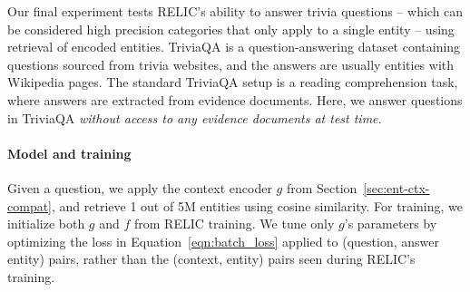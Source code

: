 \documentclass{article} \usepackage{iclr2020_conference,times}
\newcommand{\ack}{RELIC\xspace}
\newcommand{\context}{g}
\newcommand{\concept}{f}
\begin{document}
\begin{comment}
\begin{table*}[]
    \small
    \centering
    \begin{tabular}{|c|cc|cc|cc|cc|}
    \hline
    & \multicolumn{2}{c|}{Web} & \multicolumn{2}{c|}{Web verified} & \multicolumn{2}{c|}{Wiki} & \multicolumn{2}{c|}{Wiki verified} \\
    & EM & F1 & EM & F1 & EM & F1 & EM & F1 \\
    \hline
    Classifier \citep{joshi2017triviaqa} & 24.0 & 28.4 & 30.2& 34.7 & 22.5 & 26.5 & 27.3 & 31.4 \\
    SLQA \citep{wang2018multi} & 68.7 & 73.1 & 82.4 & 85.4 & 66.6 & 71.4 & 74.8 & 78.7 \\
    \ack & 39.9 & 43.4 & 44.3 & 47.6 & 38.3 & 41.8 & 40.6 & 44.5 \\
    \hline
    \end{tabular}
    \caption{TriviaQA results. \ack~simply embeds the question and finds the closest entity. The other two approaches have access to evidence documents at  top rows build representations from (entity, context) pairs. The bottom two rows have access to evidence documents at test time.}
    \label{tab:triviaqa_results}
\end{table*}
\end{comment}

Our final experiment tests \ack's ability to answer trivia questions -- which can be considered high precision categories that only apply to a single entity -- using retrieval of encoded entities.
TriviaQA \citep{joshi2017triviaqa} is a question-answering dataset containing questions sourced from trivia websites, and the answers are usually entities with Wikipedia pages. The standard TriviaQA setup is a reading comprehension task, where answers are extracted from evidence documents.
Here, we answer questions in TriviaQA \emph{without access to any evidence documents at test time.}

\paragraph{Model and training} Given a question, we apply the context encoder $\context$ from Section~\ref{sec:ent-ctx-compat}, and retrieve 1 out of 5M entities using cosine similarity.
For training, we initialize both $\context$ and $\concept$ from \ack training. We tune only $\context$'s parameters by optimizing the loss in Equation~\ref{eqn:batch_loss} applied to (question, answer entity) pairs, rather than the (context, entity) pairs seen during \ack's training.
\end{document}
